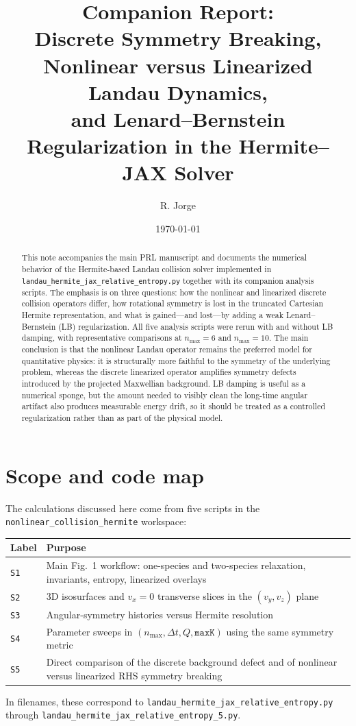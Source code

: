 \documentclass[11pt]{article}
\title{Companion Report:\\Discrete Symmetry Breaking, Nonlinear versus Linearized Landau Dynamics,\\and Lenard--Bernstein Regularization in the Hermite--JAX Solver}
\author{R. Jorge}
\date{\today}
\begin{document}
\maketitle

\begin{abstract}
This note accompanies the main PRL manuscript and documents the numerical behavior of the Hermite-based Landau collision solver implemented in
\texttt{landau\_hermite\_jax\_relative\_entropy.py} together with its companion analysis scripts.
The emphasis is on three questions: how the nonlinear and linearized discrete collision operators differ, how rotational symmetry is lost in the truncated Cartesian Hermite representation, and what is gained---and lost---by adding a weak Lenard--Bernstein (LB) regularization.
All five analysis scripts were rerun with and without LB damping, with representative comparisons at $n_{\max}=6$ and $n_{\max}=10$.
The main conclusion is that the nonlinear Landau operator remains the preferred model for quantitative physics: it is structurally more faithful to the symmetry of the underlying problem, whereas the discrete linearized operator amplifies symmetry defects introduced by the projected Maxwellian background.
LB damping is useful as a numerical sponge, but the amount needed to visibly clean the long-time angular artifact also produces measurable energy drift, so it should be treated as a controlled regularization rather than as part of the physical model.
\end{abstract}

\section{Scope and code map}
The calculations discussed here come from five scripts in the
\texttt{nonlinear\_collision\_hermite} workspace:
\begin{center}
\begin{tabular}{@{}ll@{}}
\toprule
Label & Purpose \\
\midrule
\texttt{S1} &
Main Fig.~1 workflow: one-species and two-species relaxation, invariants, entropy, linearized overlays \\
\texttt{S2} &
3D isosurfaces and $v_x=0$ transverse slices in the $(v_y,v_z)$ plane \\
\texttt{S3} &
Angular-symmetry histories versus Hermite resolution \\
\texttt{S4} &
Parameter sweeps in $(n_{\max},\Delta t,Q,\texttt{maxK})$ using the same symmetry metric \\
\texttt{S5} &
Direct comparison of the discrete background defect and of nonlinear versus linearized RHS symmetry breaking \\
\bottomrule
\end{tabular}
\end{center}
In filenames, these correspond to
\texttt{landau\_hermite\_jax\_relative\_entropy.py}
through
\texttt{landau\_hermite\_jax\_relative\_entropy\_5.py}.
\end{document}
